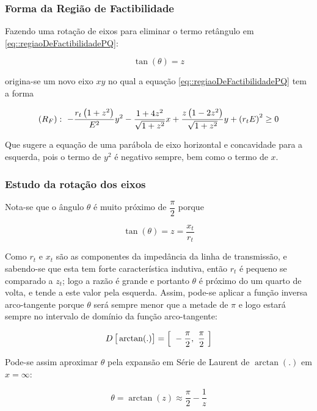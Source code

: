 \documentclass[10pt, compress,xcolor={svgnames,dvipsnames,x11names}]{beamer}
\begin{document}
\begin{frame}%
\frametitle{Forma da Região de Factibilidade}
\scriptsize

	Fazendo uma rotação de eixos para eliminar o termo retângulo em \ref{eq::regiaoDeFactibilidadePQ}:

\begin{equation}
\tan(\theta) = z
\end{equation}

 	origina-se um novo eixo $xy$ no qual a equação \ref{eq::regiaoDeFactibilidadePQ} tem a forma

\begin{align}
	\left(R_F\right):\ -\dfrac{r_t\left(\strut 1 + z^2\right)}{E^2} y^2 - \dfrac{1 + 4z^2}{\sqrt{1 + z^2}}x + \dfrac{z\left(\strut 1 - 2z^2 \right)}{\sqrt{1 + z^2}}y + \left(r_tE\right)^2 \geq 0 \label{eq::regiaoDeAlberto}
\end{align}

	Que sugere a equação de uma parábola de eixo horizontal e concavidade para a esquerda, pois o termo de $y^2$ é negativo sempre, bem como o termo de $x$.

\normalsize
\end{frame}%

\begin{frame}%
\frametitle{Estudo da rotação dos eixos}
\scriptsize

	Nota-se que o ângulo $\theta$ é muito próximo de $\dfrac{\pi}{2}$ porque

\begin{equation}
\tan(\theta) = z = \dfrac{x_t}{r_t}
\end{equation}

	Como $r_t$ e $x_t$ são as componentes da impedância da linha de transmissão, e sabendo-se que esta tem forte característica indutiva, então $r_t$ é pequeno se comparado a $z_t$; logo a razão é grande e portanto $\theta$ é próximo do um quarto de volta, e tende a este valor pela esquerda. Assim, pode-se aplicar a função inversa arco-tangente porque $\theta$ será sempre menor que a metade de $\pi$ e logo estará sempre no intervalo de domínio da função arco-tangente: 

\begin{equation}
	D\left[\strut \arctan(.) \right] = \left[\strut\ -\dfrac{\pi}{2},\ \dfrac{\pi}{2}\ \right]
\end{equation}

	Pode-se assim aproximar $\theta$ pela expansão em Série de Laurent de $\arctan(.)$ em $x = \infty$:

\begin{equation}
\theta = \arctan(z) \approx \dfrac{\pi}{2} - \dfrac{1}{z}
\end{equation}

\normalsize
\end{frame}%
\end{document}

